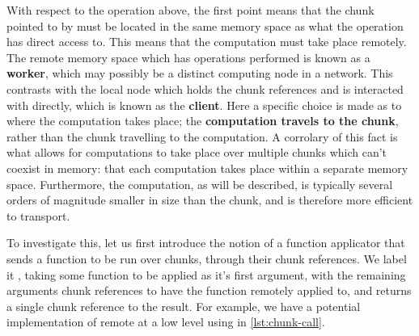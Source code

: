 With respect to the  operation above, the first point means
that the chunk pointed to by  must be located in the same
memory space as what the  operation has direct access to.
This means that the computation must take place remotely. The remote
memory space which has operations performed is known as a
\textbf{worker}, which may possibly be a distinct computing node in a
network. This contrasts with the local node which holds the chunk
references and is interacted with directly, which is known as the
\textbf{client}. Here a specific choice is made as to where the
computation takes place; the \textbf{computation travels to the chunk},
rather than the chunk travelling to the computation. A corrolary of this
fact is what allows for computations to take place over multiple chunks
which can't coexist in memory: that each computation takes place within
a separate memory space. Furthermore, the computation, as will be
described, is typically several orders of magnitude smaller in size than
the chunk, and is therefore more efficient to transport.

To investigate this, let us first introduce the notion of a function
applicator that sends a function to be run over chunks, through their
chunk references. We label it , taking some function
to be applied as it's first argument, with the remaining arguments chunk
references to have the function remotely applied to, and returns a
single chunk reference to the result. For example, we have a potential
implementation of remote  at a low level using
 in \cref{lst:chunk-call}.


